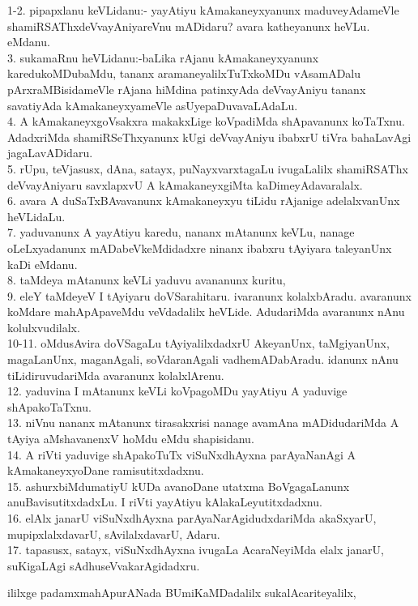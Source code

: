\documentclass{article}
\begin{document}
1-2. pipapxlanu keVLidanu:- yayAtiyu kAmakaneyxyanunx maduveyAdameVle shamiRSAThxdeVvayAniyareVnu mADidaru? avara katheyanunx heVLu. eMdanu.\\
3. sukamaRnu heVLidanu:-baLika rAjanu kAmakaneyxyanunx karedukoMDubaMdu, tananx aramaneyalilxTuTxkoMDu vAsamADalu pArxraMBisidameVle rAjana hiMdina patinxyAda deVvayAniyu tananx savatiyAda kAmakaneyxyameVle asUyepaDuvavaLAdaLu.\\
4. A kAmakaneyxgoVsakxra makakxLige koVpadiMda shApavanunx koTaTxnu. AdadxriMda shamiRSeThxyanunx kUgi deVvayAniyu ibabxrU tiVra bahaLavAgi jagaLavADidaru.\\
5. rUpu, teVjasusx, dAna, satayx, puNayxvarxtagaLu ivugaLalilx shamiRSAThx deVvayAniyaru savxlapxvU A kAmakaneyxgiMta kaDimeyAdavaralalx.\\
6. avara A duSaTxBAvavanunx kAmakaneyxyu tiLidu rAjanige adelalxvanUnx heVLidaLu.\\
7. yaduvanunx A yayAtiyu karedu, nananx mAtanunx keVLu, nanage oLeLxyadanunx mADabeVkeMdidadxre ninanx ibabxru tAyiyara taleyanUnx kaDi eMdanu.\\
8. taMdeya mAtanunx keVLi yaduvu avananunx kuritu,\\
9. eleY taMdeyeV I tAyiyaru doVSarahitaru. ivaranunx kolalxbAradu. avaranunx koMdare mahApApaveMdu veVdadalilx heVLide. AdudariMda avaranunx nAnu kolulxvudilalx.\\
10-11. oMdusAvira doVSagaLu tAyiyalilxdadxrU AkeyanUnx, taMgiyanUnx, magaLanUnx, maganAgali, soVdaranAgali vadhemADabAradu. idanunx nAnu tiLidiruvudariMda avaranunx kolalxlArenu.\\
12. yaduvina I mAtanunx keVLi koVpagoMDu yayAtiyu A yaduvige shApakoTaTxnu.\\
13. niVnu nananx mAtanunx tirasakxrisi nanage avamAna mADidudariMda A tAyiya aMshavanenxV hoMdu eMdu shapisidanu.\\
14. A riVti yaduvige shApakoTuTx viSuNxdhAyxna parAyaNanAgi A kAmakaneyxyoDane ramisutitxdadxnu.\\
15. ashurxbiMdumatiyU kUDa avanoDane utatxma BoVgagaLanunx anuBavisutitxdadxLu. I riVti yayAtiyu kAlakaLeyutitxdadxnu.\\
16. elAlx janarU viSuNxdhAyxna parAyaNarAgidudxdariMda akaSxyarU, mupipxlalxdavarU, sAvilalxdavarU, Adaru.\\
17. tapasusx, satayx, viSuNxdhAyxna ivugaLa AcaraNeyiMda elalx janarU, suKigaLAgi sAdhuseVvakarAgidadxru.\\

\begin{center}
ililxge padamxmahApurANada BUmiKaMDadalilx sukalAcariteyalilx,
\end{center}
\end{document}
